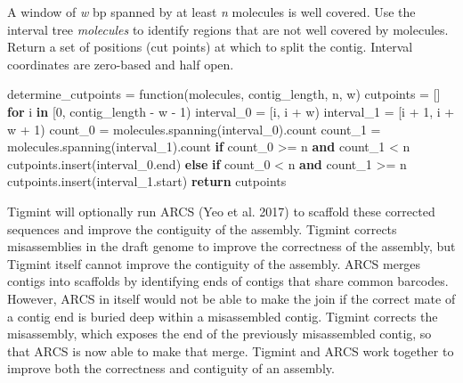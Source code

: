 \documentclass[
  12pt,
  oneside,
  openany]{book}
\newenvironment{Shaded}{}{}
\newcommand{\ControlFlowTok}[1]{\textcolor[rgb]{0.00,0.44,0.13}{\textbf{#1}}}
\newcommand{\DecValTok}[1]{\textcolor[rgb]{0.25,0.63,0.44}{#1}}
\newcommand{\KeywordTok}[1]{\textcolor[rgb]{0.00,0.44,0.13}{\textbf{#1}}}
\newcommand{\NormalTok}[1]{#1}
\newcommand{\OperatorTok}[1]{\textcolor[rgb]{0.40,0.40,0.40}{#1}}
\begin{document}
\begin{codelisting}

\caption[A window of \emph{w} bp spanned by at least \emph{n} molecules is well covered.]{A window of \emph{w} bp spanned by at least \emph{n} molecules is well covered. Use the interval tree \emph{molecules} to identify regions that are not well covered by molecules. Return a set of positions (cut points) at which to split the contig. Interval coordinates are zero-based and half open.}

\hypertarget{lst:algorithm}{%
\label{lst:algorithm}}%
\begin{Shaded}
\begin{Highlighting}[]
\NormalTok{determine_cutpoints }\OperatorTok{=}\NormalTok{ function(molecules, contig_length, n, w)}
\NormalTok{    cutpoints }\OperatorTok{=}\NormalTok{ []}
    \ControlFlowTok{for}\NormalTok{ i }\KeywordTok{in}\NormalTok{ [}\DecValTok{0}\NormalTok{, contig_length }\OperatorTok{-}\NormalTok{ w }\OperatorTok{-} \DecValTok{1}\NormalTok{)}
\NormalTok{        interval_0 }\OperatorTok{=}\NormalTok{ [i, i }\OperatorTok{+}\NormalTok{ w)}
\NormalTok{        interval_1 }\OperatorTok{=}\NormalTok{ [i }\OperatorTok{+} \DecValTok{1}\NormalTok{, i }\OperatorTok{+}\NormalTok{ w }\OperatorTok{+} \DecValTok{1}\NormalTok{)}
\NormalTok{        count_0 }\OperatorTok{=}\NormalTok{ molecules.spanning(interval_0).count}
\NormalTok{        count_1 }\OperatorTok{=}\NormalTok{ molecules.spanning(interval_1).count}
        \ControlFlowTok{if}\NormalTok{ count_0 }\OperatorTok{>=}\NormalTok{ n }\KeywordTok{and}\NormalTok{ count_1 }\OperatorTok{<}\NormalTok{ n}
\NormalTok{            cutpoints.insert(interval_0.end)}
        \ControlFlowTok{else}
        \ControlFlowTok{if}\NormalTok{ count_0 }\OperatorTok{<}\NormalTok{ n }\KeywordTok{and}\NormalTok{ count_1 }\OperatorTok{>=}\NormalTok{ n}
\NormalTok{            cutpoints.insert(interval_1.start)}
    \ControlFlowTok{return}\NormalTok{ cutpoints}
\end{Highlighting}
\end{Shaded}

\end{codelisting}

Tigmint will optionally run ARCS (Yeo et al. 2017) to scaffold these corrected sequences and improve the contiguity of the assembly. Tigmint corrects misassemblies in the draft genome to improve the correctness of the assembly, but Tigmint itself cannot improve the contiguity of the assembly. ARCS merges contigs into scaffolds by identifying ends of contigs that share common barcodes. However, ARCS in itself would not be able to make the join if the correct mate of a contig end is buried deep within a misassembled contig. Tigmint corrects the misassembly, which exposes the end of the previously misassembled contig, so that ARCS is now able to make that merge. Tigmint and ARCS work together to improve both the correctness and contiguity of an assembly.
\end{document}
